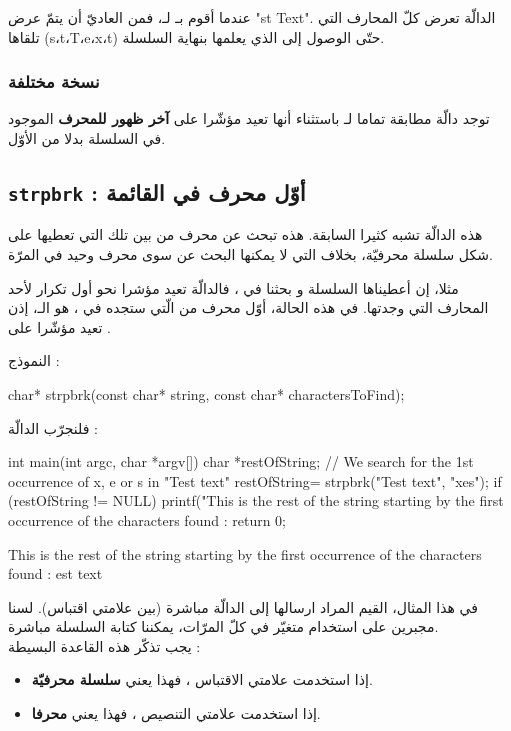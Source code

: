 عندما أقوم بـ
لـ،
فمن العاديّ أن يتمّ عرض
"\textenglish{st Text}".
الدالّة
تعرض كلّ المحارف التي تلقاها
(\textenglish{s}،\textenglish{t}،\textenglish{T}،\textenglish{e}،\textenglish{x}،\textenglish{t})
حتّى الوصول إلى
الذي يعلمها بنهاية السلسلة.
\subsubsection{نسخة مختلفة}
توجد دالّة
مطابقة تماما لـ
باستثناء أنها تعيد مؤشّرا على
\textbf{آخر ظهور للمحرف}
الموجود في السلسلة بدلا من الأوّل.

\subsection{\texttt{strpbrk} : أوّل محرف في القائمة}
هذه الدالّة تشبه كثيرا السابقة. هذه تبحث عن محرف من بين تلك التي تعطيها على شكل سلسلة محرفيّة، بخلاف
التي لا يمكنها البحث عن سوى محرف وحيد في المرّة.

مثلا، إن أعطيناها السلسلة
و بحثنا في
،
فالدالّة تعيد مؤشرا نحو أول تكرار لأحد المحارف التي وجدتها.
في هذه الحالة، أوّل محرف من
الّتي ستجده في
،
هو الـ، إذن
تعيد مؤشّرا على
.

النموذج :
\begin{Csource}
char* strpbrk(const char* string, const char* charactersToFind);
\end{Csource}
فلنجرّب الدالّة :
\begin{Csource}
int main(int argc, char *argv[])
{
	char *restOfString;
	// We search for the 1st occurrence of x, e or s in "Test text"
	restOfString= strpbrk("Test text", "xes");
	if (restOfString != NULL)
	 {
    		printf("This is the rest of the string starting by the first occurrence of the characters found : %
	}
	return 0;
}
\end{Csource}
\begin{Console}
This is the rest of the string starting by the first occurrence of the characters found : est text
\end{Console}
في هذا المثال، القيم المراد ارسالها إلى الدالّة مباشرة (بين علامتي اقتباس). لسنا مجبرين على استخدام متغيّر في كلّ المرّات، يمكننا كتابة السلسلة مباشرة.\\
يجب تذكّر هذه القاعدة البسيطة :
\begin{itemize}
  \item إذا استخدمت علامتي الاقتباس ، فهذا يعني \textbf{سلسلة محرفيّة}.
  \item إذا استخدمت علامتي التنصيص ، فهذا يعني \textbf{محرفا}.
\end{itemize}

